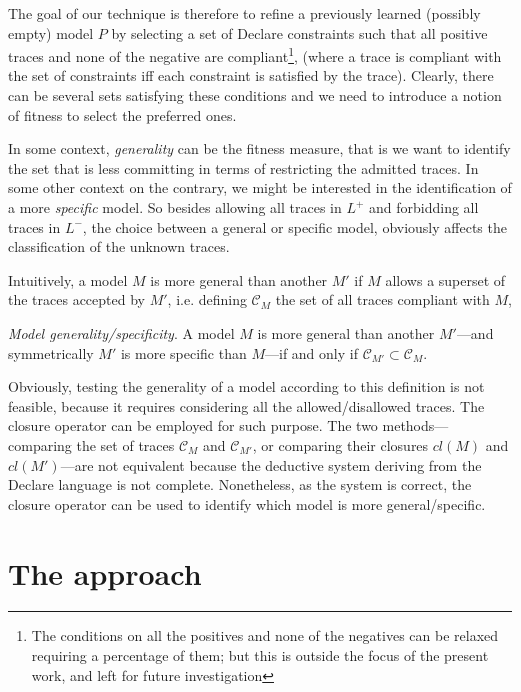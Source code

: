 The goal of our technique is therefore to refine a previously learned (possibly empty) model $P$ by selecting a set of Declare constraints such that all positive traces and none of the negative are compliant\footnote{The conditions on all the positives and none of the negatives can be relaxed requiring a percentage of them; but this is outside the focus of the present work, and left for future investigation}, (where a trace is compliant with the set of constraints iff each constraint is satisfied by the trace).
Clearly, there can be several sets satisfying these conditions and we need to introduce a notion of fitness to select the preferred ones. 

In some context, \emph{generality} can be the fitness measure, that is we want to identify the set that is less committing in terms of restricting the admitted traces. In some other context on the contrary, we might be interested in the identification of a more \emph{specific} model. So besides allowing all traces in $L^+$ and forbidding all traces in $L^-$, the choice between a general or specific model, obviously affects the classification of the unknown traces.

Intuitively, a model $M$ is more general than another $M'$ if $M$ allows a superset of the traces accepted by $M'$, i.e. defining $\mathcal{C}_M$ the set of all traces compliant with $M$, 

\theoremstyle{definition}
\begin{definition}{\emph{Model generality/specificity}.}
A model $M$ is more general than another $M'$---and symmetrically $M'$ is more specific than $M$---if and only if $\mathcal{C}_{M'} \subset \mathcal{C}_M$.
\end{definition}

Obviously, testing the generality of a model according to this definition is not feasible, because it requires considering all the allowed/disallowed traces. The closure operator can be employed for such purpose. The two methods---comparing the set of traces $\mathcal{C}_M$ and $\mathcal{C}_{M'}$, or comparing their closures ${cl}(M)$ and ${cl}(M')$---are not equivalent because the deductive system deriving from the Declare language is not complete. Nonetheless, as the system is correct, the closure operator can be used to identify which model is more general/specific.

\section{The approach}
\label{sec:approach}

